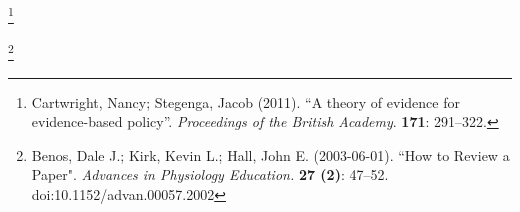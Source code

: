 


    \pagestyle{fancy}
    \hspace{0pt}
    \vfill

    \begin{center}
    \end{center}

    \hspace{0pt}
    \vfill

    \begin{center}
	\footnote{Cartwright, Nancy; Stegenga, Jacob (2011). ``A theory of evidence for evidence-based policy''. {\it Proceedings of the British Academy}. {\bfseries 171}: 291--322.}
    \end{center}
    
    \hspace{0pt}
    \vfill
    
    \begin{center}
    \end{center}

    \hspace{0pt}
    \vfill

    \begin{center}
	\footnote{Benos, Dale J.; Kirk, Kevin L.; Hall, John E. (2003-06-01). ``How to Review a Paper". {\it Advances in Physiology Education.} {\bfseries 27 (2)}: 47--52. doi:10.1152/advan.00057.2002}
    \end{center}
    
    \hspace{0pt}
    \vfill


